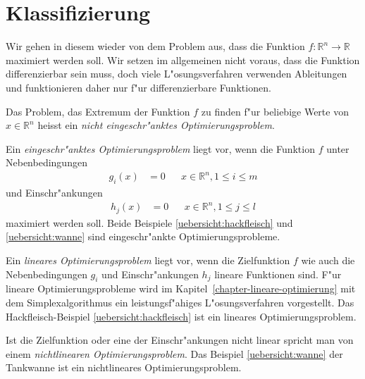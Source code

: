 \section{Klassifizierung \label{section-klassifizierung}}
Wir gehen in diesem wieder von dem Problem aus, dass die Funktion
$f\colon\mathbb R^n\to\mathbb R$ maximiert werden soll.
Wir setzen im allgemeinen nicht voraus, dass die Funktion differenzierbar
sein muss, doch viele L"osungsverfahren verwenden Ableitungen und 
funktionieren daher nur f"ur differenzierbare Funktionen.

Das Problem, das Extremum der Funktion $f$ zu finden f"ur beliebige
Werte von $x\in\mathbb R^n$ heisst ein {\em nicht eingeschr"anktes
Optimierungsproblem}.


Ein {\em eingeschr"anktes Optimierungsproblem} liegt vor, wenn die
Funktion $f$ unter
Nebenbedingungen 
\begin{align*}
g_i(x)&=0&&x\in\mathbb R^n, 1\le i\le m
\end{align*}
und Einschr"ankungen
\begin{align*}
h_j(x)&=0&&x\in\mathbb R^n, 1\le j\le l
\end{align*}
maximiert werden soll. Beide Beispiele \ref{uebersicht:hackfleisch}
und \ref{uebersicht:wanne} sind eingeschr"ankte Optimierungsprobleme.

Ein {\em lineares Optimierungsproblem} liegt vor, wenn die
Zielfunktion $f$ wie auch die Nebenbedingungen $g_i$ und
Einschr"ankungen $h_j$ lineare Funktionen sind.
F"ur lineare Optimierungsprobleme wird im
Kapitel~\ref{chapter-lineare-optimierung} mit dem Simplexalgorithmus
ein leistungsf"ahiges L"osungsverfahren vorgestellt.
Das Hackfleisch-Beispiel \ref{uebersicht:hackfleisch} ist ein lineares
Optimierungsproblem.

Ist die Zielfunktion oder eine der Einschr"ankungen nicht linear
spricht man von einem {\em nichtlinearen Optimierungsproblem}.
Das Beispiel \ref{uebersicht:wanne} der Tankwanne ist ein nichtlineares
Optimierungsproblem.

